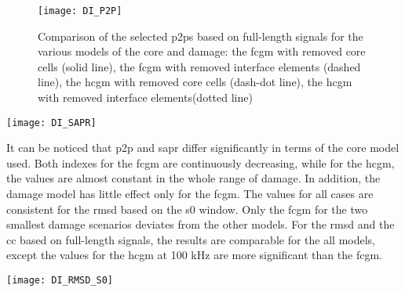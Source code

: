 \documentclass[a4paper,fleqn]{cas-dc}
\begin{document}
\begin{figure}
	\begin{center}
		\texttt{[image: DI\_P2P]}
	\end{center}
	\caption{Comparison of the selected \acfp{p2p} based on full-length signals for the various models of the core and damage: the \acf{fcgm} with removed core cells (solid line), the \ac{fcgm} with removed interface elements (dashed line), the \acf{hcgm} with removed core cells (dash-dot line), the \ac{hcgm} with removed interface elements(dotted line)}
	\label{fig:DI_P2P}
\end{figure}

\begin{figure*}[!tbh]
	\begin{center}
		\texttt{[image: DI\_SAPR]}
	\end{center}
	\caption{Comparison of the selected \acfp{sapr} based on full-length signals for the various models of the core and damage: the \acf{fcgm} with removed core cells (solid line), the \ac{fcgm} with removed interface elements (dashed line), the \acf{hcgm} with removed core cells (dash-dot line), the \ac{hcgm} with removed interface elements (dotted line)}
	\label{fig:DI_SAPR}
\end{figure*}
It can be noticed that \ac{p2p} and \ac{sapr} differ significantly in terms of the core model used. Both indexes for the \ac{fcgm} are continuously decreasing, while for the \ac{hcgm}, the values are almost constant in the whole range of damage.
In addition, the damage model has little effect only for the \ac{fcgm}.
The values for all cases are consistent for the \ac{rmsd} based on the \ac{s0} window.
Only the \ac{fcgm} for the two smallest damage scenarios deviates from the other models.
For the \ac{rmsd} and the \ac{cc} based on full-length signals, the results are comparable for the all models, except the values for the \ac{hcgm} at 100 \unit{kHz} are more significant than the \ac{fcgm}.
\begin{figure*}[!tbh]
	\begin{center}
		\texttt{[image: DI\_RMSD\_S0]}
	\end{center}
	\caption{Comparison of the selected \acfp{rmsd} based on \ac{s0} windowed signals for the various models of the core and damage: the \acf{fcgm} with removed core cells (solid line), the \ac{fcgm} with removed interface elements (dashed line), the \acf{hcgm} with removed core cells (dash-dot line), the \ac{hcgm} with removed interface elements (dotted line)}
	\label{fig:DI_RMSD_S0}
\end{figure*}
\end{document}
